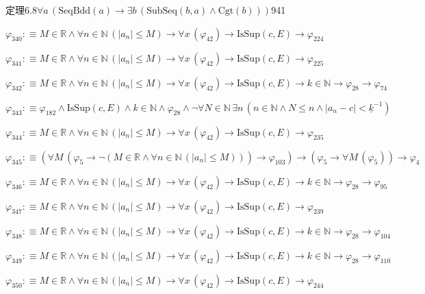 \begin{fullproof}{定理6.8}{$\forall a\,(\mathrm{SeqBdd}(a) \to \exists b\,(\mathrm{SubSeq}(b,a) \land \mathrm{Cgt}(b)))$}{941}
\begin{abbrevlist}
\item $\varphi_{340} :\equiv M \in \mathbb{R} \land \forall n \in \mathbb{N}\,(\lvert a_{n} \rvert \leq M) \to \forall x\,(\varphi_{42}) \to \mathrm{IsSup}(c,E) \to \varphi_{224}$
\item $\varphi_{341} :\equiv M \in \mathbb{R} \land \forall n \in \mathbb{N}\,(\lvert a_{n} \rvert \leq M) \to \forall x\,(\varphi_{42}) \to \mathrm{IsSup}(c,E) \to \varphi_{225}$
\item $\varphi_{342} :\equiv M \in \mathbb{R} \land \forall n \in \mathbb{N}\,(\lvert a_{n} \rvert \leq M) \to \forall x\,(\varphi_{42}) \to \mathrm{IsSup}(c,E) \to k \in \mathbb{N} \to \varphi_{28} \to \varphi_{74}$
\item $\varphi_{343} :\equiv \varphi_{182} \land \mathrm{IsSup}(c,E) \land k \in \mathbb{N} \land \varphi_{28} \land \neg \forall N \in \mathbb{N}\,\exists n\,(n \in \mathbb{N} \land N \leq n \land \lvert a_{n} - c \rvert < \underline{k}^{-1})$
\item $\varphi_{344} :\equiv M \in \mathbb{R} \land \forall n \in \mathbb{N}\,(\lvert a_{n} \rvert \leq M) \to \forall x\,(\varphi_{42}) \to \mathrm{IsSup}(c,E) \to \varphi_{235}$
\item $\varphi_{345} :\equiv (\forall M\,(\varphi_{5} \to \neg (M \in \mathbb{R} \land \forall n \in \mathbb{N}\,(\lvert a_{n} \rvert \leq M))) \to \varphi_{103}) \to (\varphi_{5} \to \forall M\,(\varphi_{5})) \to \varphi_{4}$
\item $\varphi_{346} :\equiv M \in \mathbb{R} \land \forall n \in \mathbb{N}\,(\lvert a_{n} \rvert \leq M) \to \forall x\,(\varphi_{42}) \to \mathrm{IsSup}(c,E) \to k \in \mathbb{N} \to \varphi_{28} \to \varphi_{95}$
\item $\varphi_{347} :\equiv M \in \mathbb{R} \land \forall n \in \mathbb{N}\,(\lvert a_{n} \rvert \leq M) \to \forall x\,(\varphi_{42}) \to \mathrm{IsSup}(c,E) \to \varphi_{239}$
\item $\varphi_{348} :\equiv M \in \mathbb{R} \land \forall n \in \mathbb{N}\,(\lvert a_{n} \rvert \leq M) \to \forall x\,(\varphi_{42}) \to \mathrm{IsSup}(c,E) \to k \in \mathbb{N} \to \varphi_{28} \to \varphi_{104}$
\item $\varphi_{349} :\equiv M \in \mathbb{R} \land \forall n \in \mathbb{N}\,(\lvert a_{n} \rvert \leq M) \to \forall x\,(\varphi_{42}) \to \mathrm{IsSup}(c,E) \to k \in \mathbb{N} \to \varphi_{28} \to \varphi_{110}$
\item $\varphi_{350} :\equiv M \in \mathbb{R} \land \forall n \in \mathbb{N}\,(\lvert a_{n} \rvert \leq M) \to \forall x\,(\varphi_{42}) \to \mathrm{IsSup}(c,E) \to \varphi_{244}$

\end{abbrevlist}
\end{fullproof}
